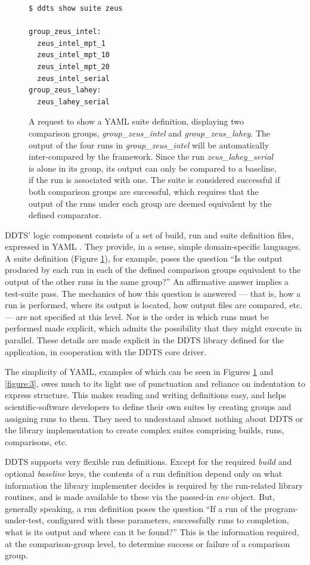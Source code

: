 \documentclass[conference]{IEEEtran}
\begin{document}
\begin{figure}[!t]
\begin{verbatim}
$ ddts show suite zeus

group_zeus_intel: 
  zeus_intel_mpt_1
  zeus_intel_mpt_10
  zeus_intel_mpt_20
  zeus_intel_serial
group_zeus_lahey: 
  zeus_lahey_serial
\end{verbatim}
\caption{A request to show a YAML suite definition, displaying two comparison groups, \emph{group\_zeus\_intel} and \emph{group\_zeus\_lahey}. The output of the four runs in \emph{group\_zeus\_intel} will be automatically inter-compared by the framework. Since the run \emph{zeus\_lahey\_serial} is alone in its group, its output can only be compared to a baseline, if the run is associated with one. The suite is considered successful if both comparison groups are successful, which requires that the output of the runs under each group are deemed equivalent by the defined comparator.}
\label{figure:2}
\end{figure}

DDTS' logic component consists of a set of build, run and suite definition files, expressed in YAML \cite{yaml}. They provide, in a sense, simple domain-specific languages. A suite definition (Figure \ref{figure:2}), for example, poses the question ``Is the output produced by each run in each of the defined comparison groups equivalent to the output of the other runs in the same group?'' An affirmative answer implies a test-suite pass. The mechanics of how this question is answered --- that is, how a run is performed, where its output is located, how output files are compared, etc. --- are not specified at this level. Nor is the order in which runs must be performed made explicit, which admits the possibility that they might execute in parallel. These details are made explicit in the DDTS library defined for the application, in cooperation with the DDTS core driver.

The simplicity of YAML, examples of which can be seen in Figures \ref{figure:2} and \ref{figure:3}, owes much to its light use of punctuation and reliance on indentation to express structure. This makes reading and writing definitions easy, and helps scientific-software developers to define their own suites by creating groups and assigning runs to them. They need to understand almost nothing about DDTS or the library implementation to create complex suites comprising builds, runs, comparisons, etc.

DDTS supports very flexible run definitions. Except for the required \emph{build} and optional \emph{baseline} keys, the contents of a run definition depend only on what information the library implementer decides is required by the run-related library routines, and is made available to these via the passed-in \emph{env} object. But, generally speaking, a run definition poses the question ``If a run of the program-under-test, configured with these parameters, successfully runs to completion, what is its output and where can it be found?'' This is the information required, at the comparison-group level, to determine success or failure of a comparison group.
\end{document}
